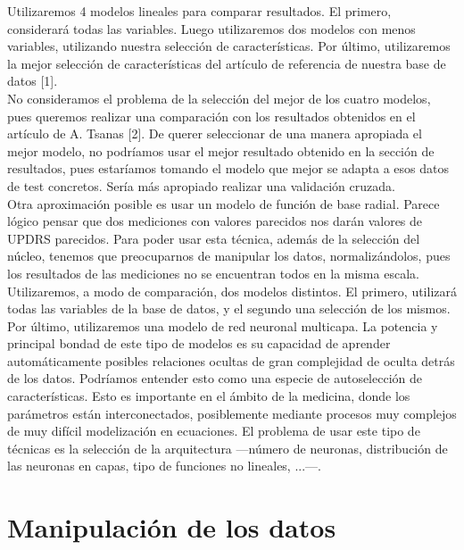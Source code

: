 Utilizaremos 4 modelos lineales para comparar resultados. El primero, considerará todas las variables. Luego utilizaremos dos modelos con menos variables, utilizando nuestra selección de características. Por último, utilizaremos la mejor selección de características del artículo de referencia de nuestra base de datos [1].\\

No consideramos el problema de la selección del mejor de los cuatro modelos, pues queremos realizar una comparación con los resultados obtenidos en el artículo de A. Tsanas [2]. De querer seleccionar de una manera apropiada el mejor modelo, no podríamos usar el mejor resultado obtenido en la sección de resultados, pues estaríamos tomando el modelo que mejor se adapta a esos datos de test concretos. Sería más apropiado realizar una validación cruzada.\\

Otra aproximación posible es usar un modelo de función de base radial. Parece lógico pensar que dos mediciones con valores parecidos nos darán valores de UPDRS parecidos. Para poder usar esta técnica, además de la selección del núcleo, tenemos que preocuparnos de manipular los datos, normalizándolos, pues los resultados de las mediciones no se encuentran todos en la misma escala.\\

Utilizaremos, a modo de comparación, dos modelos distintos. El primero, utilizará todas las variables de la base de datos, y el segundo una selección de los mismos.\\

Por último, utilizaremos una modelo de red neuronal multicapa. La potencia y principal bondad de este tipo de modelos es su capacidad de aprender automáticamente posibles relaciones ocultas de gran complejidad de oculta detrás de los datos. Podríamos entender esto como una especie de autoselección de características. Esto es importante en el ámbito de la medicina, donde los parámetros están interconectados, posiblemente mediante procesos muy complejos de muy difícil modelización en ecuaciones. El problema de usar este tipo de técnicas es la selección de la arquitectura ---número de neuronas, distribución de las neuronas en capas, tipo de funciones no lineales, ...---.\\

\newpage

\section{Manipulación de los datos}


